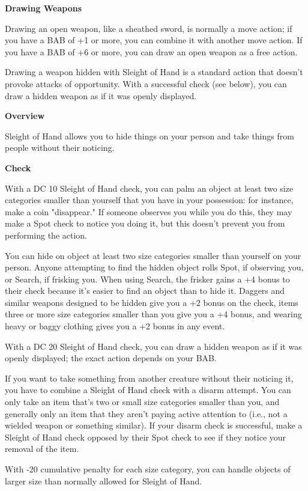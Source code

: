 \listone
	\item\textbf{Drawing Weapons}

	Drawing an open weapon, like a sheathed sword, is normally a move action; if you have a BAB of +1 or more, you can combine it with another move action. If you have a BAB of +6 or more, you can draw an open weapon as a free action.

	Drawing a weapon hidden with Sleight of Hand is a standard action that doesn't provoke attacks of opportunity. With a successful check (see below), you can draw a hidden weapon as if it was openly displayed.
	\item\textbf{Overview}

	Sleight of Hand allows you to hide things on your person and take things from people without their noticing.
	\item\textbf{Check}

	With a DC 10 Sleight of Hand check, you can palm an object at least two size categories smaller than yourself that you have in your possession: for instance, make a coin "disappear." If someone observes you while you do this, they may make a Spot check to notice you doing it, but this doesn't prevent you from performing the action.

	You can hide on object at least two size categories smaller than yourself on your person. Anyone attempting to find the hidden object rolls Spot, if observing you, or Search, if frisking you. When using Search, the frisker gains a +4 bonus to their check because it's easier to find an object than to hide it. Daggers and similar weapons designed to be hidden give you a +2 bonus on the check, items three or more size categories smaller than you give you a +4 bonus, and wearing heavy or baggy clothing gives you a +2 bonus in any event.

	With a DC 20 Sleight of Hand check, you can draw a hidden weapon as if it was openly displayed; the exact action depends on your BAB.

	If you want to take something from another creature without their noticing it, you have to combine a Sleight of Hand check with a disarm attempt. You can only take an item that's two or small size categories smaller than you, and generally only an item that they aren't paying active attention to (i.e., not a wielded weapon or something similar). If your disarm check is successful, make a Sleight of Hand check opposed by their Spot check to see if they notice your removal of the item.

	With -20 cumulative penalty for each size category, you can handle objects of larger size than normally allowed for Sleight of Hand.

